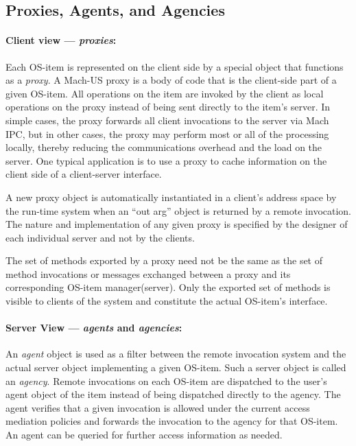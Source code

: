 \subsection{Proxies, Agents, and Agencies}
\paragraph{Client view --- {\em proxies}:}
Each OS-item is represented on the client side by a special
object that functions as a {\em proxy}\cite{SHAPIRO86}. 
A Mach-US proxy is a body of code that is the client-side part of a
given OS-item.
All operations on the
item are invoked by the client as local operations on the proxy
instead of being sent directly to the item's server.
In simple cases,
the proxy forwards all client invocations to
the server via Mach IPC,
but in other cases, the proxy may perform
most or all of the processing locally, thereby reducing the
communications overhead and the load on the server. One typical
application is to use a proxy to cache information on the client side
of a client-server interface. 

A new proxy object is automatically instantiated in a
client's address space by the run-time system
when an ``out arg'' object is returned by a remote invocation.
The nature and implementation of any given proxy is
specified by the designer of each individual server and not by the
clients.

The set of methods exported by a proxy need not be
the same as the set of method invocations or messages exchanged
between a proxy and its corresponding OS-item manager(server).
Only the exported set
of methods is visible to clients of the system and constitute the
actual OS-item's interface.

\paragraph{Server View --- {\em agents} and {\em agencies}:}
An {\em agent} object is
used as a filter between the remote invocation system and
the actual server object implementing a given OS-item.
Such a server object is called an {\em agency}.
Remote invocations on each
OS-item are dispatched to the user's agent object of the
item instead of being dispatched directly to the agency. The
agent verifies that a given invocation is allowed under the current
access mediation policies and forwards the invocation to the
agency for that OS-item.
An agent can be queried for further access information as needed.

